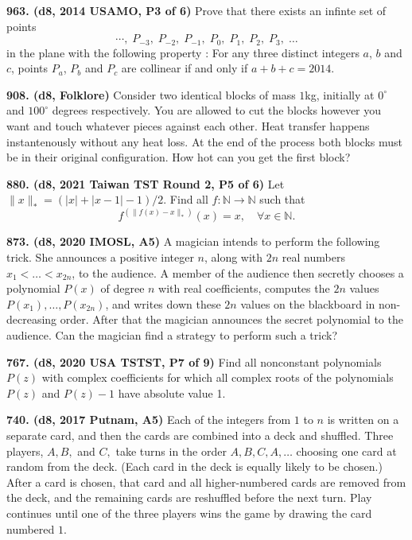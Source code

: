 \documentclass{article}
\begin{document}
\textbf{963. (\color{red}d8\color{black}, 2014 USAMO, P3 of 6)} Prove that there exists an infinte set of points \[ \cdots , \; P_{-3}, \; P_{-2},\; P_{-1},\; P_0,\; P_1,\; P_2,\; P_3,\; \dots \] in the plane with the following property : For any three distinct integers $a$, $b$ and $c$, points $P_a$, $P_b$ and $P_c$ are collinear if and only if $a+b+c=2014$.




\textbf{908. (\color{red}d8\color{black}, Folklore)} Consider two identical blocks of mass $1$kg, initially at $0^\circ$ and $100^\circ$ degrees respectively. You are allowed to cut the blocks however you want and touch whatever pieces against each other. Heat transfer happens instantenously without any heat loss. At the end of the process both blocks must be in their original configuration. How hot can you get the first block?

\textbf{880. (\color{red}d8\color{black}, 2021 Taiwan TST Round 2, P5 of 6)} Let $\|x\|_*=(|x|+|x-1|-1)/2$. Find all $f:\mathbb{N}\to\mathbb{N}$ such that \[f^{(\|f(x)-x\|_*)}(x)=x, \quad\forall x\in\mathbb{N}.\]

\textbf{873. (\color{red}d8\color{black}, 2020 IMOSL, A5)} A magician intends to perform the following trick. She announces a positive integer $n$, along with $2n$ real numbers $x_1 < \dots < x_{2n}$, to the audience. A member of the audience then secretly chooses a polynomial $P(x)$ of degree $n$ with real coefficients, computes the $2n$ values $P(x_1), \dots , P(x_{2n})$, and writes down these $2n$ values on the blackboard in non-decreasing order. After that the magician announces the secret polynomial to the audience. Can the magician find a strategy to perform such a trick?

\textbf{767. (\color{red}d8\color{black}, 2020 USA TSTST, P7 of 9)} Find all nonconstant polynomials $P(z)$ with complex coefficients for which all complex roots of the polynomials $P(z)$ and $P(z) - 1$ have absolute value 1.

\textbf{740. (\color{red}d8\color{black}, 2017 Putnam, A5)} Each of the integers from $1$ to $n$ is written on a separate card, and then the cards are combined into a deck and shuffled. Three players, $A,B,$ and $C,$ take turns in the order $A,B,C,A,\dots$ choosing one card at random from the deck. (Each card in the deck is equally likely to be chosen.) After a card is chosen, that card and all higher-numbered cards are removed from the deck, and the remaining cards are reshuffled before the next turn. Play continues until one of the three players wins the game by drawing the card numbered $1.$
\end{document}
